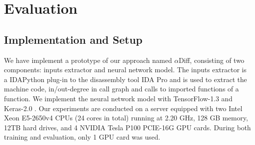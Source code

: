 \section{Evaluation}

\subsection{Implementation and Setup}
We have implement a prototype of our approach named $\alpha$Diff, consisting of two
 components: inputs extractor and neural network model. 
The inputs extractor is a IDAPython \cite{idapython} plug-in to the disassembly tool
 IDA Pro \cite{idapro} and is used to extract the machine code, in/out-degree in call
  graph and calls to imported functions of a function. 
We implement the neural network model with TensorFlow-1.3 \cite{abadi2016tensorflow}
 and Keras-2.0 \cite{chollet2015keras}. 
Our experiments are conducted on a server equipped with two Intel Xeon E5-2650v4
 CPUs (24 cores in total) running at 2.20 GHz, 128 GB memory, 12TB hard drives,
  and 4 NVIDIA Tesla P100 PCIE-16G GPU cards. 
During both training and evaluation, only 1 GPU card was used.

